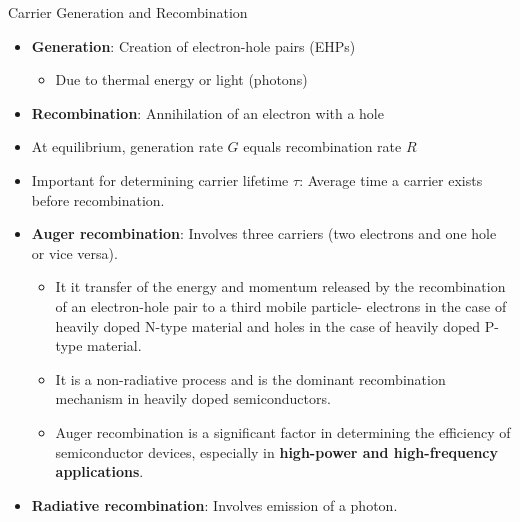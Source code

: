 
\begin{frame}{Carrier Generation and Recombination}

    \begin{itemize}
        \item \textbf{Generation}: Creation of electron-hole pairs (EHPs)
        \begin{itemize}
            \item Due to thermal energy or light (photons)
        \end{itemize}
        \item \textbf{Recombination}: Annihilation of an electron with a hole
        \item At equilibrium, generation rate $G$ equals recombination rate $R$
        \item Important for determining carrier lifetime $\tau$: Average time a carrier exists before recombination.
        \item \textbf{Auger recombination}: Involves three carriers (two electrons and one hole or vice versa). 
        \begin{itemize}
            \item It it transfer of the energy and momentum released by the recombination of an electron-hole pair to a third mobile particle- electrons in the case of heavily doped N-type material and holes in the case of heavily doped P-type material.
            \item It is a non-radiative process and is the dominant recombination mechanism in heavily doped semiconductors.
            \item Auger recombination is a significant factor in determining the efficiency of semiconductor devices, especially in \textbf{high-power and high-frequency applications}.
        \end{itemize}
        \item \textbf{Radiative recombination}: Involves emission of a photon.
    \end{itemize}

\end{frame}


